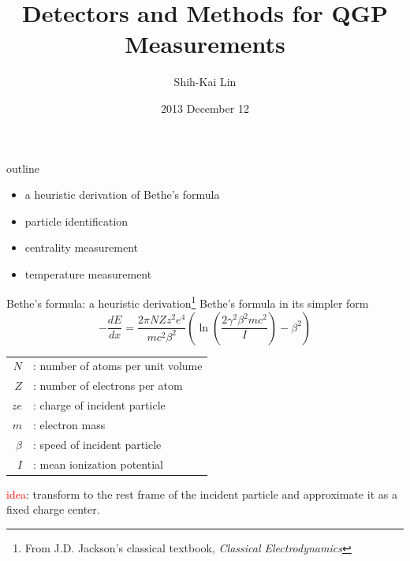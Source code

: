 \documentclass{beamer}
\title{\textbf{Detectors and Methods for QGP Measurements}}
\author{Shih-Kai Lin}
\institute{University of Houston}
\date{2013 December 12}
\begin{document}
\begin{frame}
\titlepage
\end{frame}


\begin{frame}{outline}
	\begin{itemize}
	\item a heuristic derivation of Bethe's formula
	\item particle identification
	\item centrality measurement
	\item temperature measurement
	\end{itemize}
\end{frame}


\begin{frame}{Bethe's formula: a heuristic derivation\footnote{From J.D. Jackson's classical textbook, \textit{Classical Electrodynamics}}}
Bethe's formula in its simpler form
\begin{equation}
-\frac{dE}{dx}=\frac{2\pi NZz^2e^4}{mc^2\beta^2}\left( \ln\left( \frac{2\gamma^2\beta^2mc^2}{I} \right) -\beta^2\right)
\end{equation}

\begin{table}
\scriptsize
\begin{tabular}{rl}
	$N$ & : number of atoms per unit volume \\
	$Z$ & : number of electrons per atom \\
	$ze$ & : charge of incident particle \\
	$m$ & : electron mass \\
	$\beta$ & : speed of incident particle \\
	$I$ & : mean ionization potential
\end{tabular}
\end{table}

\textcolor{red}{idea}: transform to the rest frame of the incident particle and approximate it as a fixed charge center.
\end{frame}
\end{document}
